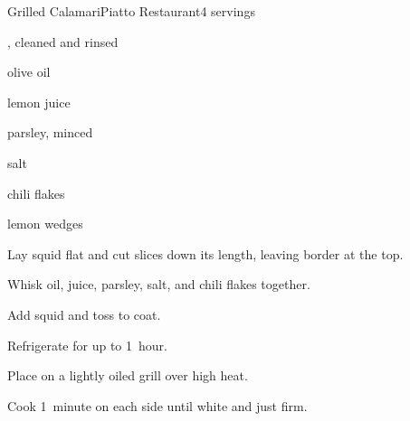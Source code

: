 \begin{recipe}{Grilled Calamari}{Piatto Restaurant}{4 servings}

\begin{ingredients}
\item {} , cleaned and rinsed
\item \C{\quarter} olive oil
\item {} lemon juice
\item {} parsley, minced
\item \tp{\half} salt
\item \tp{\half} chili flakes
\item lemon wedges
\end{ingredients}

\begin{directions}
\item Lay squid flat and cut \inch{\quarter} slices down its length, leaving \inch{\quarter} border at the top.
\item Whisk oil, juice, parsley, salt, and chili flakes together.
\item Add squid and toss to coat.
\item Refrigerate for up to 1~hour.
\item Place on a lightly oiled grill over high heat.
\item Cook 1~minute on each side until white and just firm.
\end{directions}

\end{recipe}
